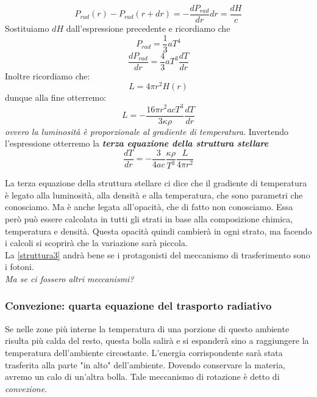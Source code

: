 \documentclass[a4paper,11pt]{article}
\begin{document}
$$P_{rad}(r)-P_{rad}(r+dr)=-\frac{dP_{rad}}{dr}dr=\frac{dH}{c}$$
Sostituiamo $dH$ dall'espressione precedente e ricordiamo che
$$P_{rad}=\frac{1}{3}aT^4$$
$$\frac{dP_{rad}}{dr}=\frac{4}{3}aT^3\frac{dT}{dr}$$
Inoltre ricordiamo che:
$$L=4\pi r^2 H(r)$$
dunque alla fine otterremo:
$$L=-\frac{16\pi r^2acT^3}{3\kappa \rho}\frac{dT}{dr}$$
\textit{ovvero la luminosità è proporzionale al gradiente di temperatura}. Invertendo l'espressione otterremo la \textbf{\textit{terza equazione della struttura stellare}}
\begin{equation}
    \frac{dT}{dr}=-\frac{3}{4ac}\frac{\kappa \rho}{T^3}\frac{L}{4\pi r^2}
    \label{struttura3}
\end{equation}

La terza equazione della struttura stellare ci dice che il gradiente di temperatura è legato alla luminosità, alla densità e alla temperatura, che sono parametri che conosciamo. Ma è anche legata all'opacità, che di fatto non conosciamo. Essa però può essere calcolata in tutti gli strati in base alla composizione chimica, temperatura e densità. Questa opacità quindi cambierà in ogni strato, ma facendo i calcoli si scoprirà che la variazione sarà piccola.\\
La \ref{struttura3} andrà bene se i protagonisti del meccanismo di trasferimento sono i fotoni.\\
\textit{Ma se ci fossero altri meccanismi?}
\subsubsection{Convezione: quarta equazione del trasporto radiativo}
Se nelle zone più interne la temperatura di una porzione di questo ambiente risulta più calda del resto, questa bolla salirà e si espanderà sino a raggiungere la temperatura dell'ambiente circostante. L'energia corrispondente sarà stata trasferita alla parte "in alto" dell'ambiente. Dovendo conservare la materia, avremo un calo di un'altra bolla. Tale meccanismo di rotazione è detto di \textit{convezione}.\\
\end{document}
